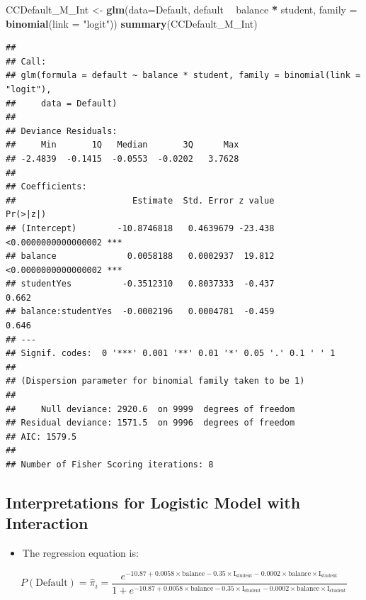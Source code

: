 \documentclass[]{book}
\newenvironment{Shaded}{\begin{snugshade}}{\end{snugshade}}
\newcommand{\KeywordTok}[1]{\textcolor[rgb]{0.13,0.29,0.53}{\textbf{#1}}}
\newcommand{\DataTypeTok}[1]{\textcolor[rgb]{0.13,0.29,0.53}{#1}}
\newcommand{\StringTok}[1]{\textcolor[rgb]{0.31,0.60,0.02}{#1}}
\newcommand{\OperatorTok}[1]{\textcolor[rgb]{0.81,0.36,0.00}{\textbf{#1}}}
\newcommand{\NormalTok}[1]{#1}
\providecommand{\tightlist}{%
  \setlength{\itemsep}{0pt}\setlength{\parskip}{0pt}}
\begin{document}
\begin{Shaded}
\begin{Highlighting}[]
\NormalTok{CCDefault_M_Int <-}\StringTok{ }\KeywordTok{glm}\NormalTok{(}\DataTypeTok{data=}\NormalTok{Default, default }\OperatorTok{~}\StringTok{ }\NormalTok{balance }\OperatorTok{*}\StringTok{ }\NormalTok{student, }\DataTypeTok{family =} \KeywordTok{binomial}\NormalTok{(}\DataTypeTok{link =} \StringTok{"logit"}\NormalTok{))}
\KeywordTok{summary}\NormalTok{(CCDefault_M_Int)}
\end{Highlighting}
\end{Shaded}

\begin{verbatim}
## 
## Call:
## glm(formula = default ~ balance * student, family = binomial(link = "logit"), 
##     data = Default)
## 
## Deviance Residuals: 
##     Min       1Q   Median       3Q      Max  
## -2.4839  -0.1415  -0.0553  -0.0202   3.7628  
## 
## Coefficients:
##                       Estimate  Std. Error z value            Pr(>|z|)    
## (Intercept)        -10.8746818   0.4639679 -23.438 <0.0000000000000002 ***
## balance              0.0058188   0.0002937  19.812 <0.0000000000000002 ***
## studentYes          -0.3512310   0.8037333  -0.437               0.662    
## balance:studentYes  -0.0002196   0.0004781  -0.459               0.646    
## ---
## Signif. codes:  0 '***' 0.001 '**' 0.01 '*' 0.05 '.' 0.1 ' ' 1
## 
## (Dispersion parameter for binomial family taken to be 1)
## 
##     Null deviance: 2920.6  on 9999  degrees of freedom
## Residual deviance: 1571.5  on 9996  degrees of freedom
## AIC: 1579.5
## 
## Number of Fisher Scoring iterations: 8
\end{verbatim}

\subsection{Interpretations for Logistic Model with
Interaction}\label{interpretations-for-logistic-model-with-interaction}

\begin{itemize}
\tightlist
\item
  The regression equation is:
\end{itemize}

\[
P(\text{Default}) = \hat{\pi}_i =  \frac{e^{-10.87+0.0058\times\text{balance}-0.35\times\text{I}_{\text{student}}-0.0002\times\text{balance}\times{\text{I}_{\text{student}}}}}{1+e^{-10.87+0.0058\times\text{balance}-0.35\times\text{I}_{\text{student}}-0.0002\times\text{balance}\times{\text{I}_{\text{student}}}}}
\]
\end{document}
